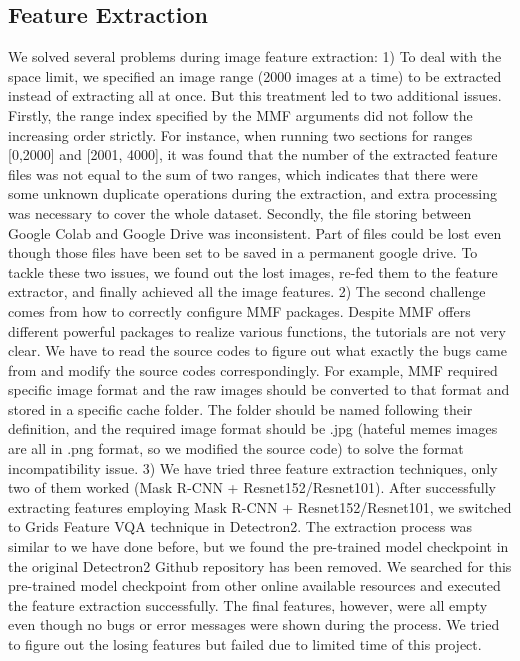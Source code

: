 \documentclass[10pt,twocolumn,letterpaper]{article}
\begin{document}
\subsection{Feature Extraction}
We solved several problems during image feature extraction: 1) To deal with the space limit, we specified an image range (2000 images at a time) to be extracted instead of extracting all at once. But this treatment led to two additional issues. Firstly, the range index specified by the MMF arguments did not follow the increasing order strictly. For instance, when running two sections for ranges [0,2000] and [2001, 4000], it was found that the number of the extracted feature files was not equal to the sum of two ranges, which indicates that there were some unknown duplicate operations during the extraction, and extra processing was necessary to cover the whole dataset. Secondly, the file storing between Google Colab and Google Drive was inconsistent. Part of files could be lost even though those files have been set to be saved in a permanent google drive. To tackle these two issues, we found out the lost images, re-fed them to the feature extractor, and finally achieved all the image features. 2) The second challenge comes from how to correctly configure MMF packages. Despite MMF offers different powerful packages to realize various functions, the tutorials are not very clear. We have to read the source codes to figure out what exactly the bugs came from and modify the source codes correspondingly. For example, MMF required specific image format and the raw images should be converted to that format and stored in a specific cache folder. The folder should be named following their definition, and the required image format should be .jpg (hateful memes images are all in .png format, so we modified the source code) to solve the format incompatibility issue. 3) We have tried three feature extraction techniques, only two of them worked (Mask R-CNN + Resnet152/Resnet101). After successfully extracting features employing Mask R-CNN + Resnet152/Resnet101, we switched to Grids Feature VQA technique in Detectron2. The extraction process was similar to we have done before, but we found the pre-trained model checkpoint in the original Detectron2 Github repository has been removed. We searched for this pre-trained model checkpoint from other online available resources and executed the feature extraction successfully. The final features, however, were all empty even though no bugs or error messages were shown during the process. We tried to figure out the losing features but failed due to limited time of this project. 
\end{document}

